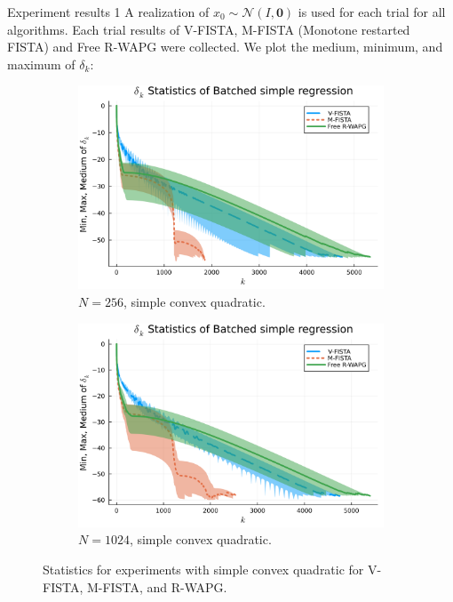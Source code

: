 \documentclass[11pt]{beamer}
\theoremstyle{definition}
\begin{document}
        \begin{frame}{Experiment results 1}
            A realization of $x_0 \sim \mathcal N(I, \mathbf 0)$ is used for each trial for all algorithms. 
            Each trial results of V-FISTA, M-FISTA (Monotone restarted FISTA) and Free R-WAPG were collected. 
            We plot the medium, minimum, and maximum of $\delta_k$: 
            \begin{figure}[H]
                \begin{subfigure}[b]{0.47\textwidth}
                    \centering
                    \includegraphics[width=\textwidth]{assets/simple_regression_batched-256.png}
                    \caption{$N = 256$, simple convex quadratic.}
                \end{subfigure}
                \hfill
                \begin{subfigure}[b]{0.47\textwidth}
                    \centering
                    \includegraphics[width=\textwidth]{assets/simple_regression_batched-1024.png}
                    \caption{$N = 1024$, simple convex quadratic. }
                \end{subfigure}
                \caption{
                    Statistics for experiments with simple convex quadratic for V-FISTA, M-FISTA, and R-WAPG.
                }
                \label{fig:simple-quadratic-NOG}
            \end{figure}
        \end{frame}
\end{document}
